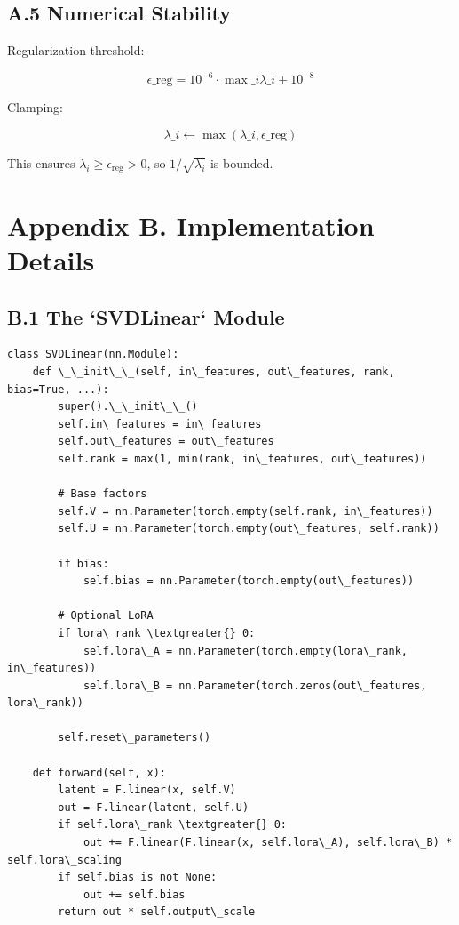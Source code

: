 \subsection{A.5 Numerical Stability}

Regularization threshold:

\[
\epsilon\_\text{reg} = 10^{-6} \cdot \max\_i \lambda\_i + 10^{-8}
\tag{A.12}
\]

Clamping:

\[
\lambda\_i \leftarrow \max(\lambda\_i, \epsilon\_\text{reg})
\tag{A.13}
\]

This ensures $\lambda_i \geq \epsilon_\text{reg} > 0$, so $1/\sqrt{\lambda_i}$ is bounded.


\section{Appendix B. Implementation Details}

\subsection{B.1 The `SVDLinear` Module}

\begin{lstlisting}
class SVDLinear(nn.Module):
    def \_\_init\_\_(self, in\_features, out\_features, rank, bias=True, ...):
        super().\_\_init\_\_()
        self.in\_features = in\_features
        self.out\_features = out\_features
        self.rank = max(1, min(rank, in\_features, out\_features))
        
        # Base factors
        self.V = nn.Parameter(torch.empty(self.rank, in\_features))
        self.U = nn.Parameter(torch.empty(out\_features, self.rank))
        
        if bias:
            self.bias = nn.Parameter(torch.empty(out\_features))
        
        # Optional LoRA
        if lora\_rank \textgreater{} 0:
            self.lora\_A = nn.Parameter(torch.empty(lora\_rank, in\_features))
            self.lora\_B = nn.Parameter(torch.zeros(out\_features, lora\_rank))
        
        self.reset\_parameters()
    
    def forward(self, x):
        latent = F.linear(x, self.V)
        out = F.linear(latent, self.U)
        if self.lora\_rank \textgreater{} 0:
            out += F.linear(F.linear(x, self.lora\_A), self.lora\_B) * self.lora\_scaling
        if self.bias is not None:
            out += self.bias
        return out * self.output\_scale
\end{lstlisting}

